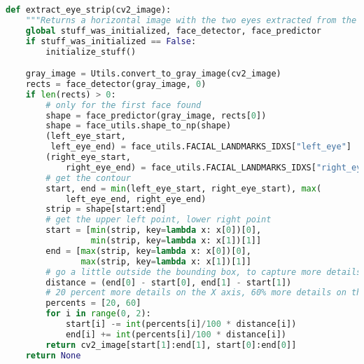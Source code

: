 \begin{lstlisting}[language=Python, caption=Extraction de ``bandeau oculaire'' en Python3]
def extract_eye_strip(cv2_image):
    """Returns a horizontal image with the two eyes extracted from the image"""
    global stuff_was_initialized, face_detector, face_predictor
    if stuff_was_initialized == False:
        initialize_stuff()

    gray_image = Utils.convert_to_gray_image(cv2_image)
    rects = face_detector(gray_image, 0)
    if len(rects) > 0:
        # only for the first face found
        shape = face_predictor(gray_image, rects[0])
        shape = face_utils.shape_to_np(shape)
        (left_eye_start,
         left_eye_end) = face_utils.FACIAL_LANDMARKS_IDXS["left_eye"]
        (right_eye_start,
            right_eye_end) = face_utils.FACIAL_LANDMARKS_IDXS["right_eye"]
        # get the contour
        start, end = min(left_eye_start, right_eye_start), max(
            left_eye_end, right_eye_end)
        strip = shape[start:end]
        # get the upper left point, lower right point
        start = [min(strip, key=lambda x: x[0])[0],
                 min(strip, key=lambda x: x[1])[1]]
        end = [max(strip, key=lambda x: x[0])[0],
               max(strip, key=lambda x: x[1])[1]]
        # go a little outside the bounding box, to capture more details
        distance = (end[0] - start[0], end[1] - start[1])
        # 20 percent more details on the X axis, 60% more details on the Y axis
        percents = [20, 60]
        for i in range(0, 2):
            start[i] -= int(percents[i]/100 * distance[i])
            end[i] += int(percents[i]/100 * distance[i])
        return cv2_image[start[1]:end[1], start[0]:end[0]]
    return None
\end{lstlisting}